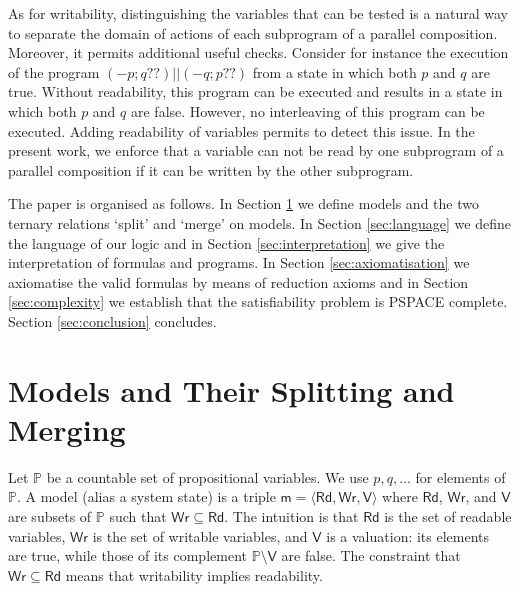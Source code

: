 \documentclass{llncs}
\newcommand{\atmset}{\mathtt{\mathbb X}}	%
\newcommand{\modl}{\mathsf m}
\newcommand{\pll}{ {||} }							%
\newcommand{\readable}[1]{\mathtt{r}_{#1}}
\newcommand{\readset}{\mathsf{Rd}}
\newcommand{\valuset}{\mathsf{V}}
\newcommand{\writable}[1]{\mathtt{w}_{#1}}
\newcommand{\writeset}{\mathsf{Wr}}
\newcommand{\testendo}{?\!\!?}			%
\newcommand{\assgnbotV}[1]{{\mathtt {-} #1}}
\newcommand{\propset}{\mathbb P}
\newcommand{\tuple}[1]{ \langle #1 \rangle}
\begin{document}
As for writability, distinguishing the variables that can be tested is a natural way to separate the domain of actions of each subprogram of a parallel composition.
Moreover, it permits additional useful checks.
Consider for instance the execution of the program $\left(\assgnbotV p ; q \testendo \right) \pll \left(\assgnbotV q ; p \testendo\right)$
from a state in which both $p$ and $q$ are true.
Without readability, this program can be executed and results in a state in which both $p$ and $q$ are false.
However, no interleaving of this program can be executed.
Adding readability of variables permits to detect this issue.
In the present work, we enforce that a variable can not be read by one subprogram of a parallel composition if it can be written by the other subprogram.

The paper is organised as follows.
In Section \ref{sec:models} we define models and the two ternary relations `split' and `merge' on models. 
In Section \ref{sec:language} we define the language of our logic and 
in Section \ref{sec:interpretation} we give the interpretation of formulas and programs. 
In Section \ref{sec:axiomatisation} we axiomatise the valid formulas by means of reduction axioms and
in Section \ref{sec:complexity} we establish that the satisfiability problem is PSPACE complete. 
Section \ref{sec:conclusion} concludes. 


\section{Models and Their Splitting and Merging }\label{sec:models} 

Let $\propset$ be a countable set of propositional variables. 
We use $p, q,\ldots$ for elements of $\propset$. 
A model (alias a system state) is a %
triple $\modl = \tuple{\readset,\writeset,\valuset}$ 
where $\readset$, $\writeset$, and $\valuset$ are subsets of $\propset$ such that $\writeset \subseteq \readset$. 
The intuition is that $\readset$ is the set of readable variables, $\writeset$ is the set of writable variables, and $\valuset$ is a valuation: 
its elements are true, while those of its complement $\propset \setminus \valuset$ are false. 
The constraint that $\writeset \subseteq \readset$ means that writability implies readability. 
\end{document}
